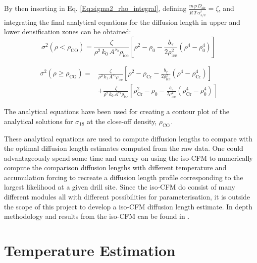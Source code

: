 \documentclass[../../CompleteThesis/Complete_1stDraft.tex]{subfiles}
\begin{document}
By then inserting in Eq. \ref{Eq:sigma2_rho_integral}, defining $\frac{m \, p \, D_{\text{air}}}{R \, T \, \alpha_{s/v}^i} = \zeta$, and integrating the final analytical equations for the diffusion length in upper and lower densification zones can be obtained:
\begin{equation}
	\sigma^2(\rho < \rho_{\text{CO}}) = \frac{\zeta}{\rho^2 \, k_0 \, A^{\nu_0} \rho_{\text{ice}}}	\left[\rho^2 - \rho_0 - \frac{b_{\tau}}{2\rho_{\text{ice}}^2}(\rho^4 - \rho_0^4)\right]
	\label{Eq:sigma2_Final_Zone1}
\end{equation}

\begin{equation}
	\begin{split}
		\sigma^2(\rho \geq \rho_{\text{CO}}) = &\frac{\zeta}{\rho^2 \, k_1 \, A^{\nu_1} \rho_{\text{ice}}}	\left[\rho^2 - \rho_{\text{Cr}} - \frac{b_{\tau}}{2\rho_{\text{ice}}^2}(\rho^4 - \rho_{\text{Cr}}^4)\right] \\
		&+ \frac{\zeta}{\rho^2 \, k_0 \, A^{\nu_0} \rho_{\text{ice}}} \left[\rho_ {\text{Cr}}^2 - \rho_0 - \frac{b_{\tau}}{2\rho_{\text{ice}}^2}(\rho_{\text{Cr}}^4 - \rho_0^4)\right]
	\end{split}
	\label{Eq:sigma2_Final_Zone2}
\end{equation}

The analytical equations have been used for creating a contour plot of the analytical solutions for $\sigma_{18}$ at the close-off density, $\rho_{\text{CO}}$. 


These analytical equations are used to compute diffusion lengths to compare with the optimal diffusion length estimates computed from the raw data. One could advantageously spend some time and energy on using the iso-CFM to numerically compute the comparison diffusion lengths with different temperature and accumulation forcing to recreate a diffusion length profile corresponding to the largest likelihood at a given drill site. Since the iso-CFM do consist of many different modules all with different possibilities for parameterisation, it is outside the scope of this project to develop a iso-CFM diffusion length estimate. In depth methodology and results from the iso-CFM can be found in \cite[Gkinis et al., 2021]{Gkinis2021}.

\section[Temperature Estimation]{Temperature Estimation}
\end{document}
